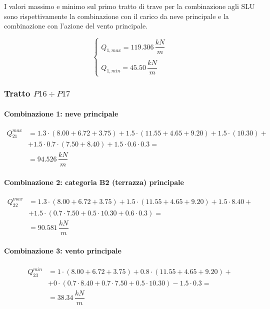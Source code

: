 I valori massimo e minimo sul primo tratto di trave per la combinazione agli SLU sono rispettivamente la combinazione con il carico da neve principale e la combinazione con l'azione del vento principale.

\begin{equation}
		\label{eq:Q1maxmin_slu}
		\begin{cases}
			Q_{1,max} = 119.306\,\dfrac{kN}{m}\\\\
			Q_{1, min} = 45.50\,\dfrac{kN}{m}
		\end{cases}
\end{equation}

\subsubsection*{Tratto $P16\div P17$}

\paragraph{Combinazione 1: neve principale}

\begin{align*}
	Q_{21}^{max} &= 1.3\cdot(8.00 +6.72 + 3.75) + 1.5\cdot(11.55+4.65 + 9.20) + 1.5\cdot(10.30)+\\
	&+ 1.5\cdot0.7\cdot(7.50+8.40) + 1.5\cdot0.6\cdot0.3 =\\
	&= 	94.526\,\dfrac{kN}{m}
\end{align*}

\paragraph{Combinazione 2: categoria B2 (terrazza) principale}

\begin{align*}
	Q_{22}^{max} &= 1.3\cdot(8.00 +6.72 + 3.75) + 1.5\cdot(11.55+4.65 + 9.20) + 1.5\cdot8.40+\\
	&+ 1.5\cdot(0.7\cdot7.50+ 0.5\cdot 10.30 + 0.6\cdot0.3) =\\
	&= 	90.581\,\dfrac{kN}{m}
\end{align*}

\paragraph{Combinazione 3: vento principale}

\begin{align*}
	Q_{23}^{min} &= 1\cdot(8.00 +6.72 + 3.75) + 0.8\cdot(11.55+4.65 + 9.20) +\\
	&+ 0\cdot(0.7\cdot 8.40 + 0.7\cdot7.50+ 0.5\cdot 10.30) -1.5\cdot0.3 =\\
	&= 	38.34\,\dfrac{kN}{m}
\end{align*}

